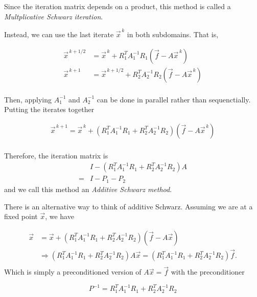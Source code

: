 Since the iteration matrix depends on a product, this method is called a \emph{Multplicative Schwarz iteration}.

Instead, we can use the last iterate $\vec{x}^{\, k}$ in both subdomains. That is,


\begin{align*}
    \vec{x}^{\, k + 1/2} &= \vec{x}^{\, k} +
    R_1^T A_1^{-1} R_1
    \left(\vec{f} - A\vec{x}^{\, k}\right)\\
    \vec{x}^{\, k + 1} &= \vec{x}^{\, k + 1/2} +
    R_2^T A_2^{-1} R_2
    \left(\vec{f} - A\vec{x}^{\, k}\right)\\
\end{align*}

Then, applying $A_1^{-1}$ and $A_2^{-1}$ can be done in parallel rather than sequenctially. Putting the iterates together

\begin{align*}
    \vec{x}^{\, k + 1} = \vec{x}^{\, k} +
    \left(R_1^T A_1^{-1} R_1 + R_2^T A_2^{-1} R_2\right)
    \left(\vec{f} - A\vec{x}^{\, k}\right)\\
\end{align*}

Therefore, the iteration matrix is
\begin{align*}
    &I - \left(R_1^T A_1^{-1} R_1 + R_2^T A_2^{-1} R_2\right)A\\
    = &I -P_1-P_2
\end{align*}
and we call this method an \emph{Additive Schwarz method}.

There is an alternative way to think of additive Schwarz. Assuming we are at a fixed point $\vec{x}$, we have 


\begin{align*}
    \vec{x} &= \vec{x}+
    \left(R_1^T A_1^{-1} R_1 + R_2^T A_2^{-1} R_2\right)
    \left(\vec{f} - A\vec{x}\right)\\
    &\Rightarrow\left(R_1^T A_1^{-1} R_1 + R_2^T A_2^{-1} R_2\right)
    A\vec{x} = \left(R_1^T A_1^{-1} R_1 + R_2^T A_2^{-1} R_2\right)\vec{f}.\\
\end{align*}
Which is simply a preconditioned version of $A\vec{x} = \vec{f}$ with the preconditioner

\begin{equation*}
    P^{-1} = R_1^T A_1^{-1} R_1 + R_2^T A_2^{-1} R_2
\end{equation*}


